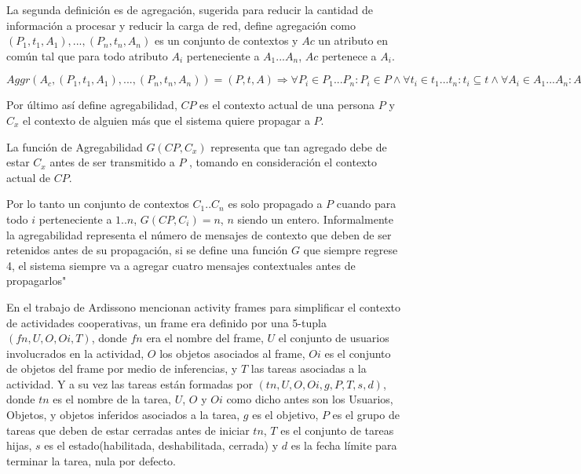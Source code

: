 La segunda definici\'on es de agregaci\'on, sugerida para reducir la cantidad de informaci\'on a procesar y reducir la carga de red, define agregaci\'on como ${ ( P_{1},t_{1},A_{1} ),..., ( P_{n},t_{n},A_{n} ) }$ es un conjunto de contextos y $Ac$ un atributo en com\'un tal que para todo atributo $A_{i}$ perteneciente a $A_{1} ... A_{n}$, $Ac$ pertenece a $A_{i}$.

$Aggr( A_{c}, {( P_{1},t_{1},A_{1} ),..., ( P_{n},t_{n},A_{n} )}) = ( P, t, A )\Rightarrow \forall P_{i}\in P_{1}...P_{n}:P_{i}\in P \wedge \forall t_{i} \in t_{1}...t_{n}:t_{i}\subseteq t \wedge \forall A_{i}\in A_{1}...A_{n}:A_{i}\in A$

Por \'ultimo as\'i define agregabilidad, $CP$ es el contexto actual de una persona $P$ y $C_{x}$ el contexto de alguien m\'as que el sistema quiere propagar a $P$.

La funci\'on de Agregabilidad $G( CP, C_{x} )$ representa que tan agregado debe de estar $C_{x}$ antes de ser transmitido a $P$ , tomando en consideraci\'on el contexto actual de $CP$.

Por lo tanto un conjunto de contextos $C_{1}..C_{n}$ es solo propagado a $P$ cuando para todo $i$ perteneciente a $1..n$, $G( CP, C_{i} ) = n$, $n$ siendo un entero. Informalmente la agregabilidad representa el n\'umero de mensajes de contexto que deben de ser retenidos antes de su propagaci\'on, si se define una funci\'on $G$ que siempre regrese 4, el sistema siempre va a agregar cuatro mensajes contextuales antes de propagarlos"

En el trabajo de Ardissono \cite{ardissono2012context} mencionan activity frames para simplificar el contexto de actividades cooperativas, un frame era definido por una 5-tupla $( fn, U, O, Oi, T )$, donde $fn$ era el nombre del frame, $U$ el conjunto de usuarios involucrados en la actividad, $O$ los objetos asociados al frame, $Oi$ es el conjunto de objetos del frame por medio de inferencias, y $T$ las tareas asociadas a la actividad. Y a su vez las tareas est\'an formadas por $( tn, U, O, Oi, g, P, T, s, d )$, donde $tn$ es el nombre de la tarea, $U$, $O$ y $Oi$ como dicho antes son los Usuarios, Objetos, y objetos inferidos asociados a la tarea, $g$ es el objetivo, $P$ es el grupo de tareas que deben de estar cerradas antes de iniciar $tn$, $T$ es el conjunto de tareas hijas, $s$ es el estado(habilitada, deshabilitada, cerrada) y $d$ es la fecha l\'imite para terminar la tarea, nula por defecto.

